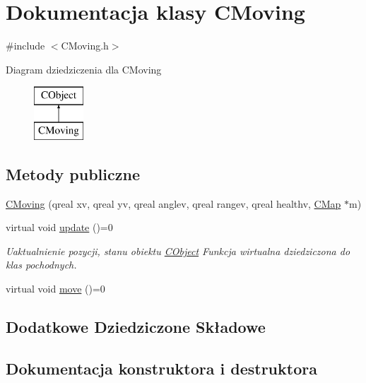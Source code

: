 \hypertarget{class_c_moving}{}\section{Dokumentacja klasy C\+Moving}
\label{class_c_moving}


{\ttfamily \#include $<$C\+Moving.\+h$>$}

Diagram dziedziczenia dla C\+Moving\begin{figure}[H]
\begin{center}
\leavevmode
\includegraphics[height=2.000000cm]{class_c_moving}
\end{center}
\end{figure}
\subsection*{Metody publiczne}
\begin{DoxyCompactItemize}
\item 
\mbox{\hyperlink{class_c_moving_af61781eac7d259a00ad1f0c908d6f084}{C\+Moving}} (qreal xv, qreal yv, qreal anglev, qreal rangev, qreal healthv, \mbox{\hyperlink{class_c_map}{C\+Map}} $\ast$m)
\item 
virtual void \mbox{\hyperlink{class_c_moving_a11819555956e63f6d43466d3ccd3653c}{update}} ()=0
\begin{DoxyCompactList}\small\item\em Uaktualnienie pozycji, stanu obiektu \mbox{\hyperlink{class_c_object}{C\+Object}} Funkcja wirtualna dziedziczona do klas pochodnych. \end{DoxyCompactList}\item 
virtual void \mbox{\hyperlink{class_c_moving_a5c5fe3a8d5f0735ad902d670185ad24c}{move}} ()=0
\end{DoxyCompactItemize}
\subsection*{Dodatkowe Dziedziczone Składowe}


\subsection{Dokumentacja konstruktora i destruktora}
\mbox{\label{class_c_moving_af61781eac7d259a00ad1f0c908d6f084}} 
